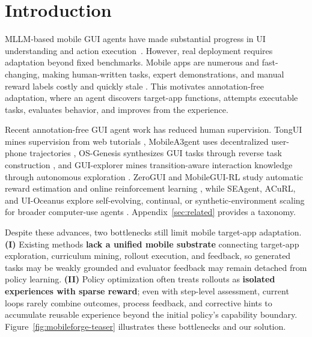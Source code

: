 
\section{Introduction}
\label{sec:introduction}

MLLM-based mobile GUI agents have made substantial progress in UI understanding and action execution~\cite{gao2026ui,zhou2025mai,hong2024cogagent,xu2026mobile,liu2025llm}. However, real deployment requires adaptation beyond fixed benchmarks. Mobile apps are numerous and fast-changing, making human-written tasks, expert demonstrations, and manual reward labels costly and quickly stale \citep{zhang2025tongui,wang2025mobilea3gent,sun2025genesis,yang2025zerogui}. This motivates annotation-free adaptation, where an agent discovers target-app functions, attempts executable tasks, evaluates behavior, and improves from the experience.

Recent annotation-free GUI agent work has reduced human supervision. TongUI mines supervision from web tutorials \citep{zhang2025tongui}, MobileA3gent uses decentralized user-phone trajectories \citep{wang2025mobilea3gent}, OS-Genesis synthesizes GUI tasks through reverse task construction \citep{sun2025genesis}, and GUI-explorer mines transition-aware interaction knowledge through autonomous exploration \citep{xie2025gui}. ZeroGUI and MobileGUI-RL study automatic reward estimation and online reinforcement learning \citep{yang2025zerogui,shi2025mobilegui}, while SEAgent, ACuRL, and UI-Oceanus explore self-evolving, continual, or synthetic-environment scaling for broader computer-use agents \citep{sun2025seagent,xue2026acurl,wu2026uioceanus}. Appendix~\ref{sec:related} provides a taxonomy.

Despite these advances, two bottlenecks still limit mobile target-app adaptation. \textbf{(I)} Existing methods \textbf{lack a unified mobile substrate} connecting target-app exploration, curriculum mining, rollout execution, and feedback, so generated tasks may be weakly grounded and evaluator feedback may remain detached from policy learning. \textbf{(II)} Policy optimization often treats rollouts as \textbf{isolated experiences with sparse reward}; even with step-level assessment, current loops rarely combine outcomes, process feedback, and corrective hints to accumulate reusable experience beyond the initial policy's capability boundary. Figure~\ref{fig:mobileforge-teaser} illustrates these bottlenecks and our solution.


